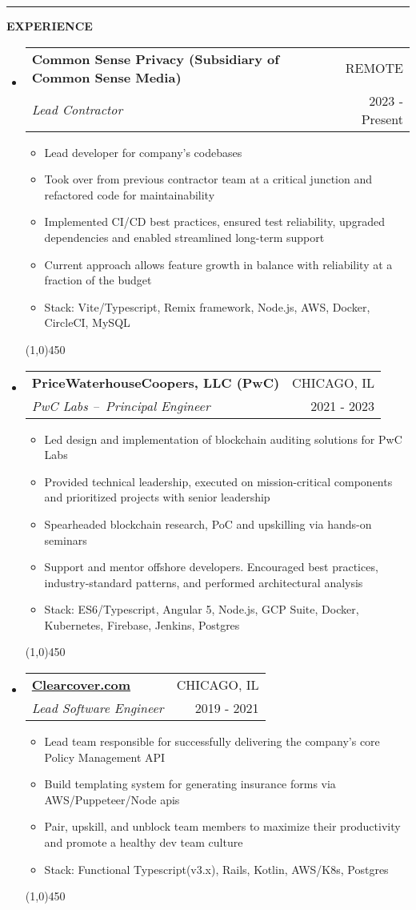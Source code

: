 \documentclass[letterpaper,11pt]{article}
\makeatletter
\newcommand{\resitem}[1]{\item #1 \vspace{-3pt}}
\newcommand{\resheading}[1]{{\large {\textbf{#1 \vphantom{p\^{E}}}}}}
\newcommand{\thinline}{\line(1,0){450}}
\newcommand{\addline}{\noindent\rule{\textwidth}{2pt}}
\newcommand{\ressubheading}[4]{
	\begin{tabular*}{6.5in}{l@{\extracolsep{\fill}}r}
    \textbf{#1} & \MakeUppercase{#2} \\
			\textit{#3} & #4 \\
	\end{tabular*}\vspace{-6pt}}
\makeatother
\begin{document}
\pagebreak
\addline

\resheading{EXPERIENCE}
\begin{itemize}

\item
  \ressubheading{Common Sense Privacy (Subsidiary of Common Sense Media\texttrademark)}{Remote}{Lead Contractor}{2023 - Present}
	\begin{itemize}
    \resitem{Lead developer for company's codebases}
    \resitem{Took over from previous contractor team at a critical junction and refactored code for maintainability}
    \resitem{Implemented CI/CD best practices, ensured test reliability, upgraded dependencies and enabled streamlined long-term support}
    \resitem{Current approach allows feature growth in balance with reliability at a fraction of the budget}
		\resitem{Stack: Vite/Typescript, Remix framework, Node.js, AWS, Docker, CircleCI, MySQL}
	\end{itemize}
  \thinline

\item
  \ressubheading{PriceWaterhouseCoopers, LLC (PwC)}{Chicago, IL}{PwC Labs – Principal Engineer}{2021 - 2023}
	\begin{itemize}
    \resitem{Led design and implementation of blockchain auditing solutions for PwC Labs}
    \resitem{Provided technical leadership, executed on mission-critical components and prioritized projects with senior leadership}
		\resitem{Spearheaded blockchain research, PoC and upskilling via hands-on seminars}
		\resitem{Support and mentor offshore developers. Encouraged best practices, industry-standard patterns, and performed architectural analysis}
		\resitem{Stack: ES6/Typescript, Angular 5, Node.js, GCP Suite, Docker, Kubernetes, Firebase, Jenkins, Postgres}
	\end{itemize}
  \thinline

\item
  \ressubheading{\href{https://clearcover.com}{Clearcover.com}}{Chicago, IL}{Lead Software Engineer}{2019 - 2021}
	\begin{itemize}
    	\resitem{Lead team responsible for successfully delivering the company's core Policy Management API}
    	\resitem{Build templating system for generating insurance forms via AWS/Puppeteer/Node apis}
		\resitem{Pair, upskill, and unblock team members to maximize their productivity and promote a healthy dev team culture}
		\resitem{Stack: Functional Typescript(v3.x), Rails, Kotlin, AWS/K8s, Postgres}
	\end{itemize}
  \thinline


\end{itemize}
\end{document}
